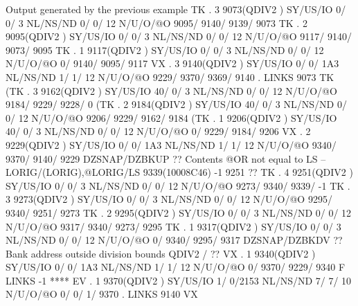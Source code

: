 \begin{Listing}{Output generated by the previous example}
 TK  .     3     9073(QDIV2   ) SY/US/IO    0/    0/   3 NL/NS/ND    0/    0/      12 N/U/O/@O    9095/    9140/    9139/    9073
 TK  .     2     9095(QDIV2   ) SY/US/IO    0/    0/   3 NL/NS/ND    0/    0/      12 N/U/O/@O    9117/    9140/    9073/    9095
 TK  .     1     9117(QDIV2   ) SY/US/IO    0/    0/   3 NL/NS/ND    0/    0/      12 N/U/O/@O       0/    9140/    9095/    9117
 VX  .     3     9140(QDIV2   ) SY/US/IO    0/    0/ 1A3 NL/NS/ND    1/    1/      12 N/U/O/@O    9229/    9370/    9369/    9140
     . LINKS      9073 TK                                                                                                        
(TK  .     3     9162(QDIV2   ) SY/US/IO   40/    0/   3 NL/NS/ND    0/    0/      12 N/U/O/@O    9184/    9229/    9228/       0
(TK  .     2     9184(QDIV2   ) SY/US/IO   40/    0/   3 NL/NS/ND    0/    0/      12 N/U/O/@O    9206/    9229/    9162/    9184
(TK  .     1     9206(QDIV2   ) SY/US/IO   40/    0/   3 NL/NS/ND    0/    0/      12 N/U/O/@O       0/    9229/    9184/    9206
 VX  .     2     9229(QDIV2   ) SY/US/IO    0/    0/ 1A3 NL/NS/ND    1/    1/      12 N/U/O/@O    9340/    9370/    9140/    9229
 DZSNAP/DZBKUP ?? Contents @OR not equal to LS -- LORIG/(LORIG),@LORIG/LS                 9339(10008C46)      -1    9251       ?? 
 TK  .     4     9251(QDIV2   ) SY/US/IO    0/    0/   3 NL/NS/ND    0/    0/      12 N/U/O/@O    9273/    9340/    9339/      -1
 TK  .     3     9273(QDIV2   ) SY/US/IO    0/    0/   3 NL/NS/ND    0/    0/      12 N/U/O/@O    9295/    9340/    9251/    9273
 TK  .     2     9295(QDIV2   ) SY/US/IO    0/    0/   3 NL/NS/ND    0/    0/      12 N/U/O/@O    9317/    9340/    9273/    9295
 TK  .     1     9317(QDIV2   ) SY/US/IO    0/    0/   3 NL/NS/ND    0/    0/      12 N/U/O/@O       0/    9340/    9295/    9317
 DZSNAP/DZBKDV ?? Bank address outside division bounds                                QDIV2   /                                ?? 
 VX  .     1     9340(QDIV2   ) SY/US/IO    0/    0/ 1A3 NL/NS/ND    1/    1/      12 N/U/O/@O       0/    9370/    9229/    9340
     F LINKS        -1 ****                                                                                                      
 EV  .     1     9370(QDIV2   ) SY/US/IO    1/    0/2153 NL/NS/ND    7/    7/      10 N/U/O/@O       0/       0/       1/    9370
     . LINKS      9140 VX                                                                                                        
\end{Listing}
